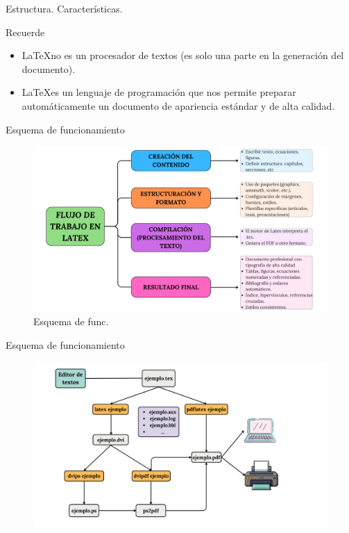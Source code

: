 \documentclass[aspectratio=169, 10pt]{beamer}
\begin{document}
\begin{frame}{Estructura. Características.}
    \begin{alertblock}{Recuerde} \pause
        \begin{itemize}
        \justifying
            \item \LaTeX no es un procesador de textos (es solo una parte en la generación del documento). \pause
            \item \LaTeX es un lenguaje de programación que nos permite preparar automáticamente un documento de apariencia estándar y de alta calidad.
        \end{itemize}
    \end{alertblock}
\end{frame}

\begin{frame}{Esquema de funcionamiento}

   \begin{figure}
        \centering
       \includegraphics[scale=0.23]{9.png} 
        \caption{Esquema de func.}
        \label{fig:9}
    \end{figure}
\end{frame}

\begin{frame}{Esquema de funcionamiento}

   \begin{figure}
        \centering
        \includegraphics[scale=0.24]{FlujoLatex.png} 
        
        \label{fig:10l}

    \end{figure}
\end{frame}
\end{document}

